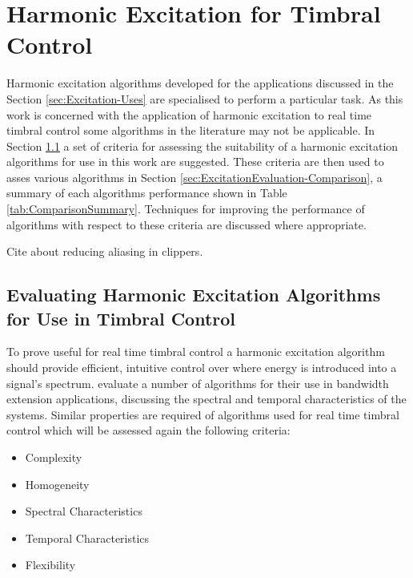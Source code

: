 
\chapter{Harmonic Excitation for Timbral Control}
\label{chap:ExcitationEvaluation}
	Harmonic excitation algorithms developed for the applications discussed in the Section \ref{sec:Excitation-Uses} are
	specialised to perform a particular task. As this work is concerned with the application of harmonic excitation to
	real time timbral control some algorithms in the literature may not be applicable. In Section
	\ref{sec:ExcitationEvaluation-Evaluation} a set of criteria for assessing the suitability of a harmonic excitation
	algorithms for use in this work are suggested. These criteria are then used to asses various algorithms in Section
	\ref{sec:ExcitationEvaluation-Comparison}, a summary of each algorithms performance shown in Table
	\ref{tab:ComparisonSummary}. Techniques for improving the performance of algorithms with respect to these criteria
	are discussed where appropriate.

\note
{
	Cite \citet{esqueda2015aliasing} about reducing aliasing in clippers.
}

\section{Evaluating Harmonic Excitation Algorithms for Use in Timbral Control}
\label{sec:ExcitationEvaluation-Evaluation}
	To prove useful for real time timbral control a harmonic excitation algorithm should provide efficient, intuitive
	control over where energy is introduced into a signal's spectrum. \citet{larsen2004audio} evaluate a number of
	algorithms for their use in bandwidth extension applications, discussing the spectral and temporal characteristics
	of the systems. Similar properties are required of algorithms used for real time timbral control which will be
	assessed again the following criteria:

	\begin{itemize}
		\item Complexity
		\item Homogeneity
		\item Spectral Characteristics
		\item Temporal Characteristics
		\item Flexibility
	\end{itemize}

